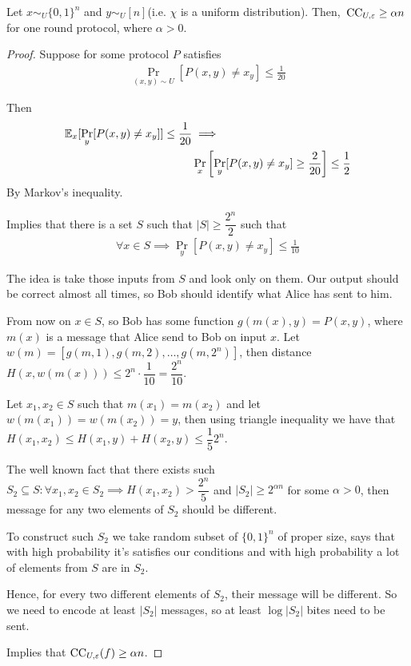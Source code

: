 \begin{thm}
	Let $x \sim_U \{0, 1\}^{n}$ and $y \sim_U [n]$(i.e. $\chi$ is a uniform distribution).	
	Then,~$\operatorname{CC}_{U, \varepsilon} \geq \alpha n$ for one round protocol, where $\alpha > 0$.
\end{thm}

\begin{proof}
	Suppose for some protocol $P$ satisfies
	\begin{align*}
		\Pr_{(x, y)\sim U}[P(x, y) \neq x_y] \leq \frac 1 {20}
	\end{align*}
	
	Then
	\begin{align*}
		\mathbb{E}_x[\Pr_y[P(x, y) \neq x_y]] \leq \frac 1 {20} &\implies \\
&\Pr_x\left[\Pr_y[P(x, y) \neq x_y] \geq \frac 2 {20}\right] \leq \frac 1 2
	\end{align*} By Markov's inequality.
	
	Implies that there is a set $S$ such that $|S| \geq \dfrac {2^n} 2$ such that
	\begin{align*}
		\forall x \in S \implies \Pr_y[P(x, y) \neq x_y] \leq \frac 1 {10}
	\end{align*}
	
	The idea is take those inputs from $S$ and look only on them.
	Our output should be correct almost all times, so Bob should identify what Alice has sent to him.
	
	From now on $x \in S$, so Bob has some function $g(m(x), y) = P(x, y)$, where $m(x)$ is a message that Alice send to Bob on input $x$.
	Let $w(m) = [g(m, 1), g(m, 2), \dots, g(m, 2^n)]$, then distance $H(x, w(m(x))) \leq 2^n \cdot \dfrac 1 {10} = \dfrac {2^n} {10}$.
	
	Let $x_1, x_2 \in S$ such that $m(x_1) = m(x_2)$ and let $w(m(x_1)) = w(m(x_2) ) = y$, then using triangle inequality we have that $H(x_1, x_2) \leq H(x_1, y) + H(x_2, y) \leq \dfrac 1 5 2^n$.
	
	The well known fact that there exists such $S_2 \subseteq S \colon \forall x_1, x_2 \in S_2 \implies H(x_1, x_2) > \dfrac {2^n} 5$ and $|S_2| \geq 2^{\alpha n}$ for some $\alpha > 0$, then message for any two elements of $S_2$ should be different.
	
	To construct such $S_2$ we take random subset of $\{0, 1\}^n$ of proper size, says that with high probability it's satisfies our conditions and with high probability a lot of elements from $S$ are in $S_2$.
	
	Hence, for every two different elements of $S_2$, their message will be different. So we need to encode at least $|S_2|$ messages, so at least $\log |S_2|$ bites need to be sent.
	
	Implies that $\operatorname{CC}_{U, \varepsilon} (f) \geq \alpha n$.
\end{proof}

